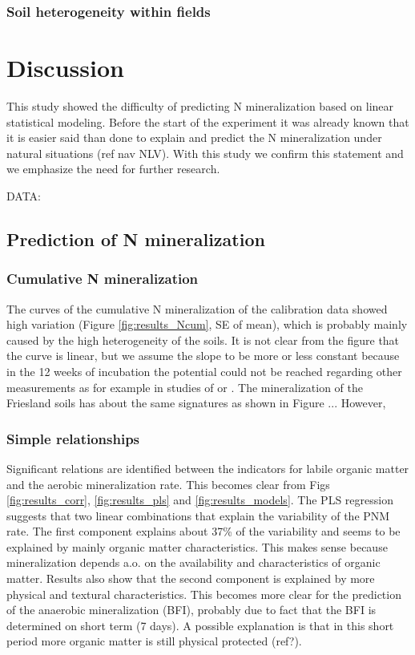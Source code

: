 \documentclass[10pt,twoside,dutch,english]{report}
\begin{document}
\subsection{Soil heterogeneity within fields}



\chapter{Discussion}
This study showed the difficulty of predicting N mineralization based on linear statistical modeling. Before the start of the experiment it was already known that it is easier said than done to explain and predict the N mineralization under natural situations (ref nav NLV). With this study we confirm this statement and we emphasize the need for further research. 

DATA:


\section{Prediction of N mineralization}
\subsection{Cumulative N mineralization}
The curves of the cumulative N mineralization of the calibration data showed high variation (Figure \ref{fig:results_Ncum}, SE of mean), which is probably mainly caused by the high heterogeneity of the soils. It is not clear from the figure that the curve is linear, but we assume the slope to be more or less  constant because in the 12 weeks of incubation the potential could not be reached regarding other measurements as for example in studies of \citet{Ros2011} or \citet{Dessureault-Rompre2013}.
The mineralization of the Friesland soils has about the same signatures as shown in Figure ... However, 

\subsection{Simple relationships  }
Significant relations are identified between the indicators for labile organic matter and the aerobic mineralization rate. This becomes clear from Figs \ref{fig:results_corr}, \ref{fig:results_pls} and \ref{fig:results_models}. The PLS regression suggests that two linear combinations that explain the variability of the PNM rate. The first component explains about 37\% of the variability and seems to be explained by mainly organic matter characteristics. This makes sense because mineralization depends a.o. on the availability and characteristics of organic matter. Results also show that the second component is explained by more physical and textural characteristics. This becomes more clear for the prediction of the anaerobic mineralization (BFI), probably due to fact that the BFI is determined on short term (7 days). A possible explanation is that in this short period more organic matter is still physical protected (ref?).
\end{document}
